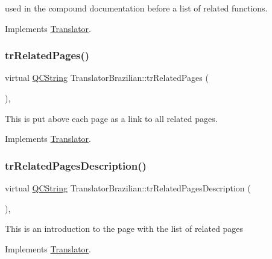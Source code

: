 used in the compound documentation before a list of related functions. 

Implements \mbox{\hyperlink{class_translator}{Translator}}.

\mbox{\label{class_translator_brazilian_afd4e628abefc4376423d3faeb66e78e8}} 
\subsubsection{\texorpdfstring{trRelatedPages()}{trRelatedPages()}}
{\footnotesize\ttfamily virtual \mbox{\hyperlink{class_q_c_string}{Q\+C\+String}} Translator\+Brazilian\+::tr\+Related\+Pages (\begin{DoxyParamCaption}{ }\end{DoxyParamCaption})\hspace{0.3cm}{\ttfamily [inline]}, {\ttfamily [virtual]}}

This is put above each page as a link to all related pages. 

Implements \mbox{\hyperlink{class_translator}{Translator}}.

\mbox{\label{class_translator_brazilian_a17b0487abd10850e2a526f823ebfa8dd}} 
\subsubsection{\texorpdfstring{trRelatedPagesDescription()}{trRelatedPagesDescription()}}
{\footnotesize\ttfamily virtual \mbox{\hyperlink{class_q_c_string}{Q\+C\+String}} Translator\+Brazilian\+::tr\+Related\+Pages\+Description (\begin{DoxyParamCaption}{ }\end{DoxyParamCaption})\hspace{0.3cm}{\ttfamily [inline]}, {\ttfamily [virtual]}}

This is an introduction to the page with the list of related pages 

Implements \mbox{\hyperlink{class_translator}{Translator}}.

\mbox{\label{class_translator_brazilian_adaf08e6f35912bacbb919fe915f3a8d1}} 
